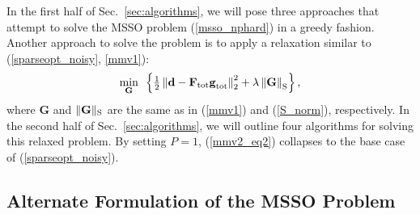 \documentclass[final]{siamltex}
\newcommand{\la}[1]{\mbox{$\mathbf{#1}$}}  \newcommand{\sst}[1]{\mbox{\scriptsize{#1}}}
\begin{document}
   In the first half of Sec.~\ref{sec:algorithms}, we will pose three
   approaches that attempt to solve the MSSO problem
   (\ref{msso_nphard}) in a greedy fashion.  Another approach to solve
   the problem is to apply a relaxation similar to
   (\ref{sparseopt_noisy}, \ref{mmv1}):
   \begin{equation}\label{mmv2_eq2}
   \mathop{\mbox{min}}_{\mbox{\scriptsize{\la{G}}}} \mbox{  }
      \left \{
        \tfrac{1}{2}  \left \Vert \la{d} -
                      \la{F}_{\mbox{\scriptsize{tot}}}
                      \la{g}_{\mbox{\scriptsize{tot}}}
                      \right \Vert_2^2
       +     \lambda  \left \Vert \la{G} \right \Vert_{\mbox{\scriptsize{S}}}
      \right \},
   \end{equation}
   where \la{G} and $\Vert \la{G} \Vert_{\mbox{\scriptsize{S}}}$ are
   the same as in (\ref{mmv1}) and (\ref{S_norm}), respectively. In
   the second half of Sec.~\ref{sec:algorithms}, we will outline four
   algorithms for solving this relaxed problem.  By setting $P = 1$,
   (\ref{mmv2_eq2}) collapses to the base case of
   (\ref{sparseopt_noisy}).

\subsection{Alternate Formulation of the MSSO Problem}
\end{document}
